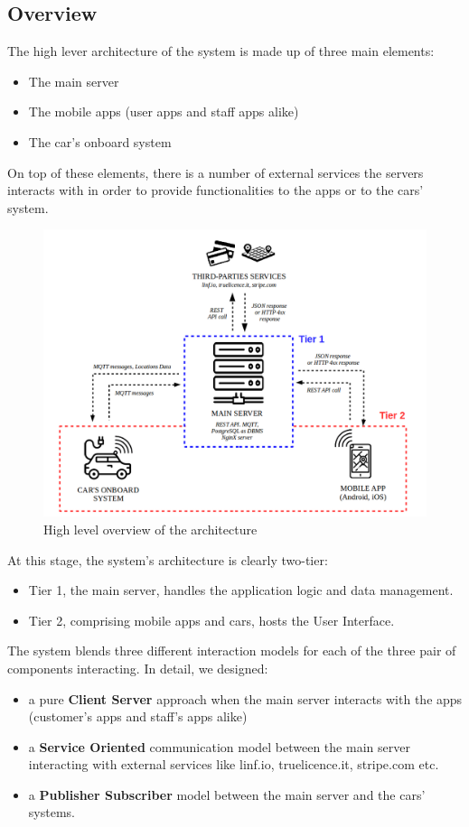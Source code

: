 \documentclass[11pt]{article} %
\begin{document}
\subsection{Overview}

The high lever architecture of the system is made up of three main elements:
\begin{itemize}[noitemsep]
	\item The main server
	\item The mobile apps (user apps and staff apps alike)
	\item The car's onboard system
\end{itemize}
On top of these elements, there is a number of external services the servers interacts with in order to provide functionalities to the apps or to the cars' system.

\begin{figure}[H]
	\centering
	\includegraphics[width=1\textwidth]{proposed_system.png}
	\caption{High level overview of the architecture}
\end{figure}	

At this stage, the system's architecture is clearly two-tier:
\begin{itemize}[noitemsep]
	\item Tier 1, the main server, handles the application logic and data management.
	\item Tier 2, comprising mobile apps and cars, hosts the User Interface.
\end{itemize}

The system blends three different interaction models for each of the three pair of components interacting. In detail, we designed:
\begin{itemize}
	\item a pure \textbf{Client Server} approach when the main server interacts with the apps (customer's apps and staff's apps alike)
	\item a \textbf{Service Oriented} communication model between the main server interacting with external services like linf.io, truelicence.it, stripe.com etc.
	\item a \textbf{Publisher Subscriber} model between the main server and the cars' systems.
\end{itemize}
\end{document}
